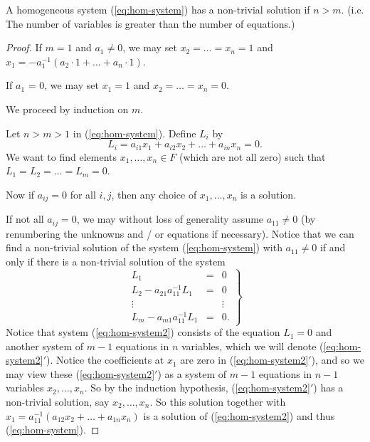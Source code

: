 \begin{theorem} \label{thm:1}
	A homogeneous system (\ref{eq:hom-system}) has a non-trivial solution if $n > m$. (i.e. The number of variables is greater than the number of equations.)
	\begin{proof}
		If $m = 1$ and $a_1 \neq 0$, we may set $x_2 = \ldots = x_n = 1$ and $x_1 = -a_1^{-1}(a_2 \cdot 1 + \ldots + a_n \cdot 1)$.
		
		If $a_1$ = 0, we may set $x_1 = 1$ and $x_2 = \ldots = x_n = 0$.
		
		We proceed by induction on $m$.
		
		Let $n > m > 1$ in (\ref{eq:hom-system}). Define $L_i$ by
		\[
			L_i = a_{i 1} x_1 + a_{i 2} x_2 + \ldots + a_{i n} x_n = 0.
		\]
		We want to find elements $x_1, \ldots, x_n \in F$ (which are not all zero) such that $L_1 = L_2 = \ldots = L_m = 0$.
		
		Now if $a_{i j} = 0$ for all $i, j$, then any choice of $x_1, \ldots, x_n$ is a solution.
		
		If not all $a_{i j} = 0$, we may without loss of generality assume $a_{1 1} \neq 0$ (by renumbering the unknowns and / or equations if necessary). Notice that we can find a non-trivial solution of the system (\ref{eq:hom-system}) with $a_{1 1} \neq 0$ if and only if there is a non-trivial solution of the system
		\begin{equation} \label{eq:hom-system2}
			\left.
			\begin{matrix}
				L_1							 &=& 0 \\
				L_2 - a_{21} a_{11}^{-1} L_1 &=& 0 \\
				\vdots						 & & \vdots \\
				L_m - a_{m1} a_{11}^{-1} L_1 &=& 0.
			\end{matrix}
			\right\}
		\end{equation}
		Notice that system (\ref{eq:hom-system2}) consists of the equation $L_1 = 0$ and another system of $m - 1$ equations in $n$ variables, which we will denote (\ref{eq:hom-system2}$'$). Notice the coefficients at $x_1$ are zero in (\ref{eq:hom-system2}$'$), and so we may view these (\ref{eq:hom-system2}$'$) as a system of $m - 1$ equations in $n - 1$ variables $x_2, \ldots, x_n$. So by the induction hypothesis, (\ref{eq:hom-system2}$'$) has a non-trivial solution, say $x_2, \ldots, x_n$. So this solution together with $x_1 = a_{11}^{-1}(a_{12}x_2 + \ldots + a_{1n}x_n)$ is a solution of (\ref{eq:hom-system2}) and thus (\ref{eq:hom-system}).
	\end{proof}
\end{theorem}

